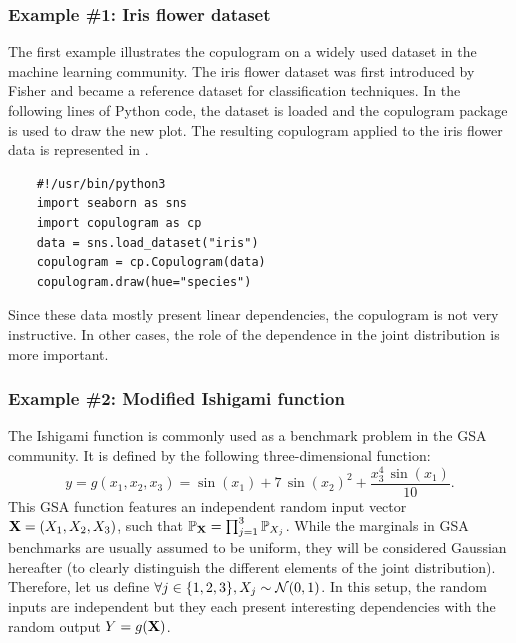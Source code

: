 
\subsubsection{Example \#1: Iris flower dataset}
The first example illustrates the copulogram on a widely used dataset in the machine learning community. 
The iris flower dataset was first introduced by Fisher and became a reference dataset for classification techniques. 
In the following lines of Python code, the dataset is loaded and the copulogram package is used to draw the new plot. 
The resulting copulogram applied to the iris flower data is represented in . 
\lstset{style=mystyle, language=python}
%
\begin{lstlisting}
    #!/usr/bin/python3        
    import seaborn as sns
    import copulogram as cp
    data = sns.load_dataset("iris")
    copulogram = cp.Copulogram(data)
    copulogram.draw(hue="species")
\end{lstlisting}
%
Since these data mostly present linear dependencies, the copulogram is not very instructive. 
In other cases, the role of the dependence in the joint distribution is more important.



\subsubsection{Example \#2: Modified Ishigami function}
The Ishigami function is commonly used as a benchmark problem in the GSA community. 
It is defined by the following three-dimensional function: 
\begin{equation}
    y = g(x_1, x_2, x_3) = \sin(x_1) + 7 \, \sin(x_2)^2 + \frac{x_3^4 \, \sin(x_1)}{10}.
\end{equation}
This GSA function features an independent random input vector ${\bf X}=(X_1, X_2, X_3)$, such that $\mathbb{P}_{\bf X}=\prod_{j=1}^{3} \mathbb{P}_{X_j}$. 
While the marginals in GSA benchmarks are usually assumed to be uniform, they will be considered Gaussian hereafter (to clearly distinguish the different elements of the joint distribution). 
Therefore, let us define $\forall j \in \{1, 2, 3\}, X_j\sim \mathcal{N}(0, 1)$. 
In this setup, the random inputs are independent but they each present interesting dependencies with the random output $Y=g({\bf X})$.

